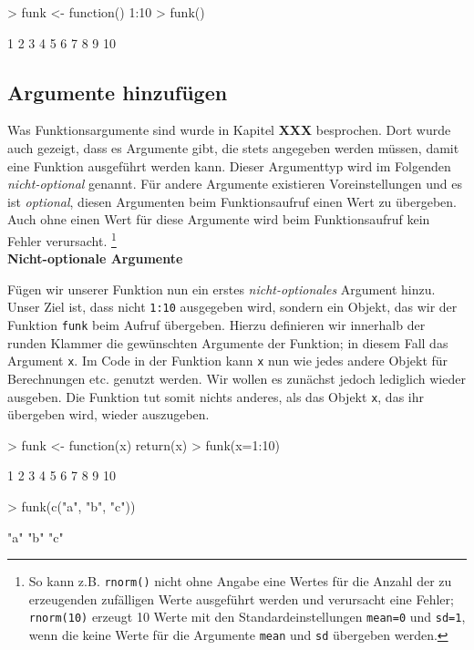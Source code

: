 \documentclass[12pt, a4paper,twoside,openany,x11names,svgnames]{memoir}
\begin{document}
\begin{Schunk}
\begin{Sinput}
> funk <- function(){
   1:10
 }
> funk()
\end{Sinput}
\begin{Soutput}
 [1]  1  2  3  4  5  6  7  8  9 10
\end{Soutput}
\end{Schunk}


\subsection{Argumente hinzufügen}

Was Funktionsargumente sind wurde in Kapitel \textbf{XXX} besprochen. Dort wurde auch gezeigt, dass es Argumente gibt, die stets angegeben werden müssen, damit eine Funktion ausgeführt werden kann. Dieser Argumenttyp wird im Folgenden \emph{nicht-optional} genannt. Für andere Argumente existieren Voreinstellungen und es ist \emph{optional}, diesen Argumenten beim Funktionsaufruf einen Wert zu übergeben. Auch ohne einen Wert für diese Argumente wird beim Funktionsaufruf kein Fehler verursacht. \footnote{So kann z.B. \texttt{rnorm()} nicht ohne Angabe eine Wertes für die Anzahl der zu erzeugenden zufälligen Werte ausgeführt werden und verursacht eine Fehler; \texttt{rnorm(10)} erzeugt 10 Werte mit den Standardeinstellungen \texttt{mean=0} und \texttt{sd=1}, wenn die keine Werte für die Argumente \texttt{mean} und \texttt{sd} übergeben werden.} \\

\textbf{Nicht-optionale Argumente} 

Fügen wir unserer Funktion nun ein erstes \emph{nicht-optionales} Argument hinzu. Unser Ziel ist, dass nicht \texttt{1:10} ausgegeben wird, sondern ein Objekt, das wir der Funktion \texttt{funk} beim Aufruf übergeben. Hierzu definieren wir innerhalb der runden Klammer die gewünschten Argumente der Funktion; in diesem Fall das Argument \texttt{x}. Im Code in der Funktion kann \texttt{x} nun wie jedes andere Objekt für Berechnungen etc. genutzt werden. Wir wollen es zunächst jedoch lediglich wieder ausgeben. Die Funktion tut somit nichts anderes, als das Objekt \texttt{x}, das ihr übergeben wird, wieder auszugeben.

\begin{Schunk}
\begin{Sinput}
> funk <- function(x){
   return(x)
 }
> funk(x=1:10)
\end{Sinput}
\begin{Soutput}
 [1]  1  2  3  4  5  6  7  8  9 10
\end{Soutput}
\begin{Sinput}
> funk(c("a", "b", "c"))
\end{Sinput}
\begin{Soutput}
[1] "a" "b" "c"
\end{Soutput}
\end{Schunk}
\end{document}
